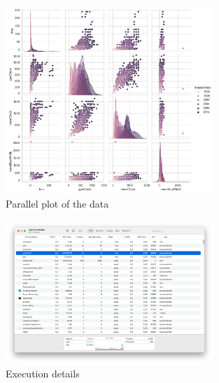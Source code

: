 \documentclass[conference,onecolumn]{IEEEtran}
\begin{document}
\begin{figure}[H]
    \centering
    \includegraphics[width=0.7\textwidth]{Plots/DataPariPlot.png}
    \caption{Parallel plot of the data}
    \label{appdx:parallelPlotOfTheData}
\end{figure}

\begin{figure}[H]
    \centering
    \includegraphics[width=0.7\textwidth]{ExucutionDetails.png}
    \caption{Execution details}
    \label{appdx:executionDetails}
\end{figure}

\newpage


\end{document}
